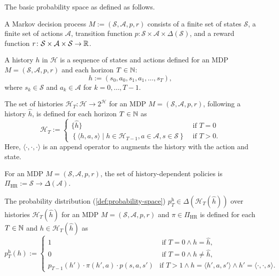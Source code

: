 The basic probability space as defined as follows.
\begin{definition}
  A Markov decision process $M := (\mathcal{S}, \mathcal{A}, p, r)$ consists of a finite set of states $\mathcal{S}$, a finite set of actions $\mathcal{A}$, transition function $p\colon \mathcal{S} \times \mathcal{A} \times \Delta(\mathcal{S})$, and a reward function $r \colon \mathcal{S} \times \mathcal{A} \times \mathcal{S} \to \mathbb{R}$.
  \leanok
\end{definition}

\begin{definition}[History]
  A history $h$ in $\mathcal{H}$ is a sequence of states and actions defined for an MDP $M = (\mathcal{S}, \mathcal{A}, p, r)$ and each horizon $T \in \mathbb{N}$:
  \[
    h := (s_0, a_0, s_1, a_1, \dots , s_T),
  \]
  where $s_k \in \mathcal{S}$ and $a_k\in \mathcal{A}$ for $k = 0, \dots , T-1$.
  \leanok
\end{definition}

\begin{definition}[Histories]
  The set of histories $\mathcal{H}_T \colon  \mathcal{H} \to 2^{\mathcal{H}}$ for an MDP $M = (\mathcal{S}, \mathcal{A}, p, r)$, following a history $\hat{h}$, is defined for each horizon $T \in \mathbb{N}$ as
  \[
    \mathcal{H}_T :=
    \begin{cases}
        \{ \hat{h} \} &\text{ if } T = 0 \\      
        \left\{ \langle h, a, s \rangle \mid h \in \mathcal{H}_{T-1}, a\in \mathcal{A}, s\in \mathcal{S} \right\} &\text{ if } T > 0.
    \end{cases}
  \]
  Here, $\langle \cdot , \cdot , \cdot  \rangle$ is an append operator to augments the history with the action and state.
  \leanok
\end{definition}

\begin{definition}
  For an MDP $M = (\mathcal{S}, \mathcal{A}, p, r)$, the set of history-dependent policies is $\Pi_{\mathrm{HR}} := \mathcal{S} \to \Delta(\mathcal{A})$.
  \leanok
\end{definition}

\begin{definition}
  The probability distribution (\cref{def:probability-space}) $p^{\mathrm{h}}_T \in \Delta(\mathcal{H}_T(\hat{h}))$ over histories $\mathcal{H}_T(\hat{h})$ for an MDP $M = (\mathcal{S}, \mathcal{A}, p, r)$ and $\pi \in \Pi_{\mathrm{HR}}$ is defined for each $T \in \mathbb{N}$ and $h\in \mathcal{H}_T(\hat{h})$ as
  \[
    p^{\mathrm{h}}_T(h) :=
    \begin{cases}
      1 & \text{ if } T = 0 \wedge h = \hat{h}, \\
      0 & \text{ if } T = 0 \wedge h \neq  \hat{h}, \\
      p_{T-1}(h') \cdot \pi(h',a) \cdot  p(s, a , s') &\text{if } T > 1 \wedge h = \langle h', a, s' \rangle \wedge h' = \langle \cdot , \cdot , s \rangle.
    \end{cases}
  \]
  \leanok
\end{definition}

